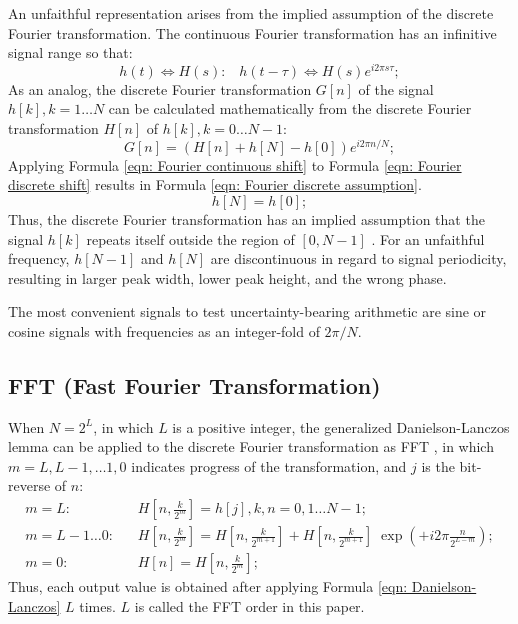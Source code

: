 \documentclass[twoside]{article}
\numberwithin{equation}{section}
\newcommand{\eqspace}{\;\;\;}
\begin{document}
An unfaithful representation arises from the implied assumption of the discrete Fourier transformation.  
The continuous Fourier transformation has an infinitive signal range so that:
\begin{equation}
\label{eqn: Fourier continuous shift}
h(t) \Leftrightarrow H(s): \eqspace h(t - \tau) \Leftrightarrow H(s) e^{i 2\pi s \tau};
\end{equation}
As an analog, the discrete Fourier transformation $G[n]$ of the signal $h[k], k = 1 \dots N$ can be calculated mathematically from the discrete Fourier transformation $H[n]$ of $h[k], k = 0\dots N-1$:
\begin{equation}
\label{eqn: Fourier discrete shift}
G[n] = (H[n] + h[N] - h[0]) e^{i 2\pi n/N};
\end{equation}
Applying Formula \eqref{eqn: Fourier continuous shift} to Formula \eqref{eqn: Fourier discrete shift} results in Formula \eqref{eqn: Fourier discrete assumption}.
\begin{equation}
\label{eqn: Fourier discrete assumption}
h[N] = h[0];
\end{equation}
Thus, the discrete Fourier transformation has an implied assumption that the signal $h[k]$ repeats itself outside the region of $[0, N-1]$ \cite{Numerical_DFT}.  
For an unfaithful frequency, $h[N-1]$ and $h[N]$ are discontinuous in regard to signal periodicity, resulting in larger peak width, lower peak height, and the wrong phase.  

The most convenient signals to test uncertainty-bearing arithmetic are sine or cosine signals with frequencies as an integer-fold of $2\pi/N$.  
 

\subsection{FFT (Fast Fourier Transformation)}

When $N = 2^{L}$, in which $L$ is a positive integer, the generalized Danielson-Lanczos lemma \cite{Numerical_Recipes} can be applied to the discrete Fourier transformation as FFT \cite{Numerical_Recipes}, in which $m = L, L-1,\dots 1,0$ indicates progress of the transformation, and $j$ is the bit-reverse of $n$:
\begin{align}
m=L: \eqspace & H[n,\frac{k}{2^{m}}] = h[j],  k,n = 0,1\dots N-1; \\
\label{eqn: Danielson-Lanczos}
m=L-1 \dots 0: \eqspace & H[n,\frac{k}{2^{m}}] = H[n,\frac{k}{2^{m+1}}] + H[n,\frac{k}{2^{m+1}}]\; \exp{(+i 2\pi \frac{n}{2^{L-m}})}; \\
m=0: \eqspace & H[n] = H[n,\frac{k}{2^{m}}];
\end{align}
Thus, each output value is obtained after applying Formula \eqref{eqn: Danielson-Lanczos} $L$ times.  
$L$ is called the FFT order in this paper.  
\end{document}
